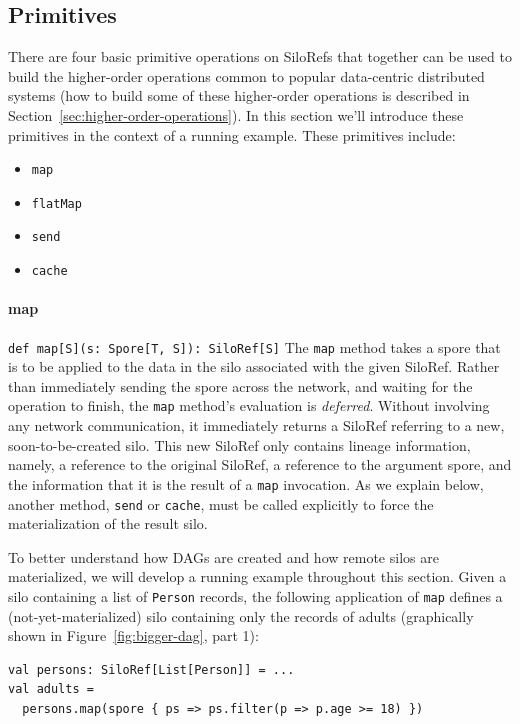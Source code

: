 \documentclass{jfp1}
\begin{document}
\subsection{Primitives}
\label{sec:primitives}

There are four basic primitive operations on SiloRefs that together can be used
to build the higher-order operations common to popular data-centric distributed
systems (how to build some of these higher-order operations is described in
Section~\ref{sec:higher-order-operations}). In this section we'll introduce
these primitives in the context of a running example. These primitives include:

\begin{itemize}[noitemsep,nolistsep]
\item \verb|map|
\item \verb|flatMap|
\item \verb|send|
\item \verb|cache|
\end{itemize}

\paragraph{map}%
%
\texttt{def map[S](s: Spore[T, S]): SiloRef[S]} \newline
%
The \verb|map| method takes a spore that is to be applied to the data in the
silo associated with the given SiloRef. Rather than immediately sending the
spore across the network, and waiting for the operation to finish, the
\verb|map| method's evaluation is \emph{deferred}. Without involving any network
communication, it immediately returns a SiloRef referring to a new,
soon-to-be-created silo. This new SiloRef only contains lineage information,
namely, a reference to the original SiloRef, a reference to the argument spore,
and the information that it is the result of a \verb|map| invocation. As we
explain below, another method, \verb|send| or \verb|cache|, must be called
explicitly to force the materialization of the result silo.

To better understand how DAGs are created and how remote silos are
materialized, we will develop a running example throughout this section. Given
a silo containing a list of \verb|Person| records, the following application of
\verb|map| defines a (not-yet-materialized) silo containing only the records of
adults (graphically shown in Figure~\ref{fig:bigger-dag}, part 1):

\begin{lstlisting}
val persons: SiloRef[List[Person]] = ...
val adults =
  persons.map(spore { ps => ps.filter(p => p.age >= 18) })
\end{lstlisting}
\end{document}
